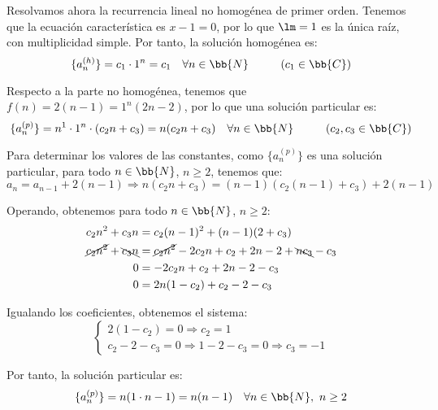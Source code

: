 \documentclass[12pt]{article}
\begin{document}
\begin{ejercicio}
    Resolvamos ahora la recurrencia lineal no homogénea de primer orden. Tenemos que la ecuación
    característica es $x-1=0$, por lo que $\lm=1$ es la única raíz, con multiplicidad simple.
    Por tanto, la solución homogénea es:
    \begin{equation*}
        \{a_n^{(h)}\} = c_1\cdot 1^n = c_1 \quad \forall n\in \bb{N}\hspace{1cm} (c_1\in \bb{C})
    \end{equation*}
    
    
    Respecto a la parte no homogénea,
    tenemos que $f(n)=2(n-1)=1^n(2n-2)$, por lo que una solución particular es:
    \begin{equation*}
        \{a_n^{(p)}\} = n^1\cdot 1^n \cdot (c_2n + c_3) = n(c_2n + c_3) \quad \forall n\in \bb{N}\hspace{1cm} (c_2, c_3\in \bb{C})
    \end{equation*}

    Para determinar los valores de las constantes, como $\{a_n^{(p)}\}$ es una solución particular,
    para todo $n\in \bb{N}$, $n\geq 2$, tenemos que:
    \begin{equation*}
        a_n =a_{n-1} + 2(n-1) \Longrightarrow n(c_2n + c_3) = (n-1)(c_2(n-1) + c_3) + 2(n-1)
    \end{equation*}

    Operando, obtenemos para todo $n\in \bb{N}$, $n\geq 2$:
    \begin{align*}
        {c_2n^2}+{c_3n} &= c_2(n-1)^2 + (n-1)(2+c_3)\\
        \cancel{c_2n^2}+\bcancel{c_3n} &=  \cancel{c_2n^2} - 2c_2n + c_2 + 2n - 2 + \bcancel{nc_3} - c_3\\
        0 &= -2c_2n + c_2 + 2n - 2 - c_3\\
        0 &= 2n(1-c_2) + c_2 - 2 - c_3
    \end{align*}

    Igualando los coeficientes, obtenemos el sistema:
    \begin{equation*}
        \left\{
            \begin{array}{l}
                2(1-c_2) = 0  \Longrightarrow c_2 = 1\\
                c_2 - 2 - c_3 = 0  \Longrightarrow 1 - 2 - c_3 = 0 \Longrightarrow c_3 = -1
            \end{array}
        \right.
    \end{equation*}

    Por tanto, la solución particular es:
    \begin{equation*}
        \{a_n^{(p)}\} = n(1\cdot n - 1) = n(n-1) \quad \forall n\in \bb{N},~n\geq 2
    \end{equation*}


\end{ejercicio}
\end{document}
